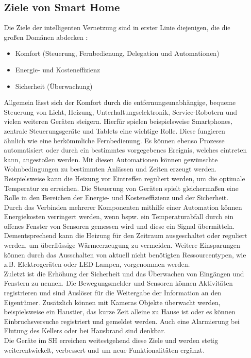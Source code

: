     \subsection{Ziele von Smart Home} %
    \label{subsec:ziele_sh}
        Die Ziele der intelligenten Vernetzung sind in erster Linie diejenigen, die die 
        großen Domänen abdecken \cite{goals-smarthome}:
        \begin{itemize}
            \item Komfort (Steuerung, Fernbedienung, Delegation und Automationen)
            \item Energie- und Kosteneffizienz
            \item Sicherheit (Überwachung)
        \end{itemize}
        Allgemein lässt sich der Komfort durch die entfernungsunabhängige, bequeme Steuerung von Licht, Heizung, Unterhaltungselektronik, 
        Service-Robotern und vielen weiteren Geräten steigern. 
        Hierfür spielen beispielsweise Smartphones, zentrale Steuerungsgeräte und Tablets eine wichtige Rolle. 
        Diese fungieren ähnlich wie eine herkömmliche Fernbedienung. Es können ebenso Prozesse 
        automatisiert oder durch ein bestimmtes vorgegebenes Ereignis, welches 
        eintreten kann, angestoßen werden. Mit diesen Automationen können gewünschte Wohnbedingungen zu 
        bestimmten Anlässen und Zeiten erzeugt werden. Beispielsweise kann die Heizung vor Eintreffen reguliert 
        werden, um die optimale Temperatur zu erreichen. Die Steuerung von 
        Geräten spielt gleichermaßen eine Rolle in den Bereichen der Energie- und Kosteneffizienz und der Sicherheit. 
        \\
        \linebreak
        Durch das Verbinden mehrerer Komponenten mithilfe einer Automation können Energiekosten verringert werden, wenn 
        bspw. ein Temperaturabfall durch ein offenes Fenster von Sensoren gemessen wird und diese ein Signal übermitteln. 
        Dementsprechend kann die Heizung für den Zeitraum 
        ausgeschaltet oder reguliert werden, um überflüssige Wärmeerzeugung zu vermeiden. Weitere Einsparungen können durch 
        das Ausschalten von aktuell nicht benötigten Ressourcentypen, wie z.B. Elektrogeräten 
        oder LED-Lampen, vorgenommen werden.
        \\
        \linebreak
        Zuletzt ist die Erhöhung der Sicherheit und das Überwachen von Eingängen und Fenstern zu nennen.
        Die Bewegungsmelder und Sensoren können Aktivitäten registrieren und sind Auslöser für die Weitergabe 
        der Information an den Eigentümer. Zusätzlich können mit Kameras Objekte überwacht werden, beispielsweise ein Haustier, das 
        kurze Zeit alleine zu Hause ist oder es können Einbruchsversuche registriert und gemeldet werden. Auch eine Alarmierung bei 
        Flutung des Kellers oder bei Hausbrand sind denkbar.
        \\
        \linebreak
        Die Geräte im \acl{SH} erreichen weitestgehend diese Ziele und werden stetig weiterentwickelt, verbessert und um neue 
        Funktionalitäten ergänzt.

